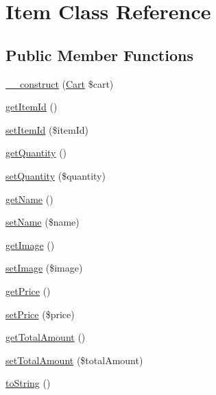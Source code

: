 \hypertarget{class_item}{\section{Item Class Reference}
\label{class_item}
}
\subsection*{Public Member Functions}
\begin{DoxyCompactItemize}
\item 
\hyperlink{class_item_a2d53d5d99a547c3ed6be0c04748f9e1d}{\+\_\+\+\_\+construct} (\hyperlink{class_cart}{Cart} \$cart)
\item 
\hyperlink{class_item_a5b01110117f0cd71a5a115dc8b9eab6f}{get\+Item\+Id} ()
\item 
\hyperlink{class_item_a22de7a673c95892b16b497788139add1}{set\+Item\+Id} (\$item\+Id)
\item 
\hyperlink{class_item_abae8ce0df3d9f49efcba4904a2d030a6}{get\+Quantity} ()
\item 
\hyperlink{class_item_a77b9e38b40fb75050257ec6cd18bb1a9}{set\+Quantity} (\$quantity)
\item 
\hyperlink{class_item_a3d0963e68bb313b163a73f2803c64600}{get\+Name} ()
\item 
\hyperlink{class_item_a2fe666694997d047711d7653eca2f132}{set\+Name} (\$name)
\item 
\hyperlink{class_item_a2af8add37797384585cae101fb8cbfe7}{get\+Image} ()
\item 
\hyperlink{class_item_af785d0fb8da1ba24ec74c2f9f7e27c0a}{set\+Image} (\$image)
\item 
\hyperlink{class_item_a38146d2beb1dd6dfd0f2a5886e18a538}{get\+Price} ()
\item 
\hyperlink{class_item_a2e232712bdbc759793fab2cf08506c25}{set\+Price} (\$price)
\item 
\hyperlink{class_item_ae305b3e3acedd1fa9854e72f83af22c1}{get\+Total\+Amount} ()
\item 
\hyperlink{class_item_a56860f621c6e6e47042e41fa4e59d13b}{set\+Total\+Amount} (\$total\+Amount)
\item 
\hyperlink{class_item_a5558c5d549f41597377fa1ea8a1cefa3}{to\+String} ()
\end{DoxyCompactItemize}
